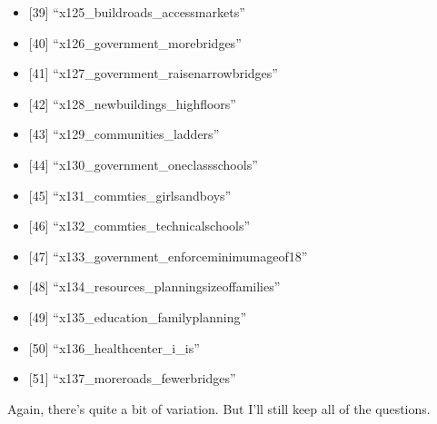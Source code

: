\documentclass[12pt,]{article}
\providecommand{\tightlist}{%
\setlength{\itemsep}{0pt}\setlength{\parskip}{0pt}}
\begin{document}
\begin{itemize}
\tightlist
\item
  {[}39{]} ``x125\_buildroads\_accessmarkets''\\
\item
  {[}40{]} ``x126\_government\_morebridges''\\
\item
  {[}41{]} ``x127\_government\_raisenarrowbridges''\\
\item
  {[}42{]} ``x128\_newbuildings\_highfloors''\\
\item
  {[}43{]} ``x129\_communities\_ladders''\\
\item
  {[}44{]} ``x130\_government\_oneclassschools''\\
\item
  {[}45{]} ``x131\_commties\_girlsandboys''\\
\item
  {[}46{]} ``x132\_commties\_technicalschools''\\
\item
  {[}47{]} ``x133\_government\_enforceminimumageof18''\\
\item
  {[}48{]} ``x134\_resources\_planningsizeoffamilies''\\
\item
  {[}49{]} ``x135\_education\_familyplanning''\\
\item
  {[}50{]} ``x136\_healthcenter\_i\_is''\\
\item
  {[}51{]} ``x137\_moreroads\_fewerbridges''
\end{itemize}

Again, there's quite a bit of variation. But I'll still keep all of the
questions.
\end{document}
